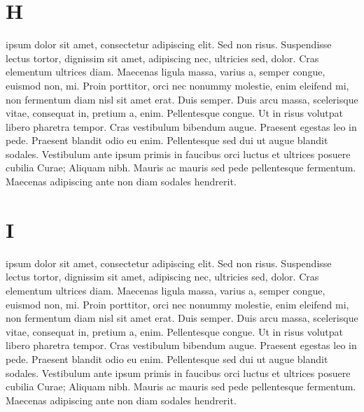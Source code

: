 \documentclass{article}
\begin{document}
\pend
\endnumbering

\section{H}


\beginnumbering
\pstart
{}       ipsum dolor sit amet, consectetur adipiscing elit. Sed non risus. Suspendisse lectus tortor, dignissim sit amet, adipiscing nec, ultricies sed, dolor. Cras elementum ultrices diam. Maecenas ligula massa, varius a, semper congue, euismod non, mi. Proin porttitor, orci nec nonummy molestie, enim  eleifend mi, non fermentum diam nisl sit amet erat. Duis semper. Duis arcu massa, scelerisque vitae, consequat in, pretium a, enim. Pellentesque congue. Ut in risus volutpat libero pharetra tempor. Cras vestibulum bibendum augue. Praesent egestas leo in pede. Praesent blandit odio eu enim. Pellentesque sed dui ut augue blandit sodales. Vestibulum ante ipsum primis in faucibus orci luctus et ultrices posuere cubilia Curae; Aliquam nibh. Mauris ac mauris sed pede pellentesque fermentum. Maecenas adipiscing ante non diam sodales hendrerit. 

\pend
\endnumbering


\section{I}


\beginnumbering
\pstart
{}       ipsum dolor sit amet, consectetur adipiscing elit. Sed non risus. Suspendisse lectus tortor, dignissim sit amet, adipiscing nec, ultricies sed, dolor. Cras elementum ultrices diam. Maecenas ligula massa, varius a, semper congue, euismod non, mi. Proin porttitor, orci nec nonummy molestie, enim  eleifend mi, non fermentum diam nisl sit amet erat. Duis semper. Duis arcu massa, scelerisque vitae, consequat in, pretium a, enim. Pellentesque congue. Ut in risus volutpat libero pharetra tempor. Cras vestibulum bibendum augue. Praesent egestas leo in pede. Praesent blandit odio eu enim. Pellentesque sed dui ut augue blandit sodales. Vestibulum ante ipsum primis in faucibus orci luctus et ultrices posuere cubilia Curae; Aliquam nibh. Mauris ac mauris sed pede pellentesque fermentum. Maecenas adipiscing ante non diam sodales hendrerit. 

\pend
\endnumbering
\end{document}
